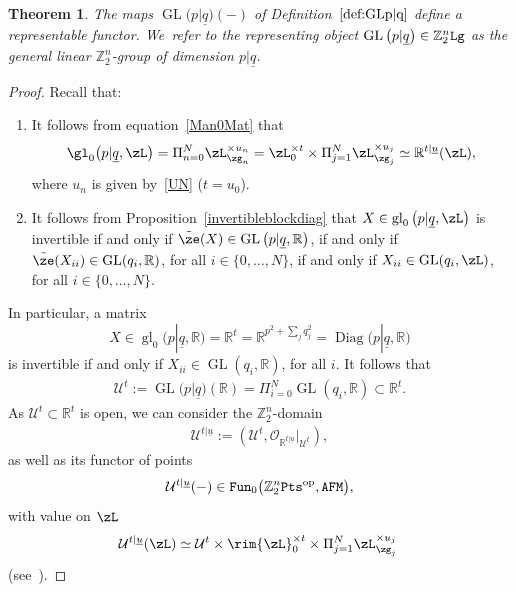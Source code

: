 \documentclass[10pt,a4paper]{amsart}
\newcommand{\op}[1]{\operatorname{#1}}
\newcommand{\R}{{\mathbb R}}
\newcommand{\Z}{{\mathbb Z}}
\def\ul{\underline}
\def\cO{\mathcal{O}}
\def\cU{\mathcal{U}}
\def\ul{\underline}
\newcommand{\0}{\otimes}
\newcommand{\z}{\Z_2^n}
\numberwithin{equation}{section}
\newtheorem{Theorem}{Theorem}[section]
\begin{document}
\begin{Theorem}\label{thm:GLRep}
The maps $\op{GL}\big(p|\ul q\big)(-)$ of Definition~$\ref{def:GLp|q}$ define a representable functor. We~refer to the representing object $\op{GL}\big(p|\ul q\big)\in\z{\tt Lg}$ as the \emph{general linear $\z$-group of dimension} $p|\ul q$. \end{Theorem}



\begin{proof}

Recall that:
\begin{enumerate}\itemsep=0pt
\item
It follows from equation~\eqref{Man0Mat} that
\[
\gl_0\big(p|\ul{q},\zL\big)=\Pi_{n=0}^N\zL_{\zg_n}^{\times u_n}=\zL_0^{\times t}\times \Pi_{j=1}^N \zL_{\zg_j}^{\times u_j}\simeq\R^{t|\ul u}(\zL),
\]
 where $u_n$ is given by~\eqref{UN} ($t=u_0$).

\item
It follows from Proposition~\ref{invertibleblockdiag} that $X\in\op{gl}_0\big(p|\ul q,\zL\big)$ is invertible if and only if $\tilde{\ze}(X)\in\op{GL}\big(p|\ul q,\R\big)$, if and only if $\tilde{\ze}(X_{ii})\in\op{GL}(q_i,\R)$, for all $i\in\{0,\dots, N\}$, if and only if $X_{ii}\in\op{GL}(q_i,\zL)$, for all $i\in\{0,\dots, N\}$.\end{enumerate}

In particular, a matrix
\[
X\in\op{gl}_0\big(p|\ul q,\R\big)=\R^t=\R^{p^2+\sum_jq_j^2}=\op{Diag}\big(p|\ul q,\R\big)
\]
is invertible if and only if $X_{ii}\in\op{GL}(q_i,\R)$, for all $i$. It follows that \begin{gather}\label{GL1}
\cU^t:=\op{GL}\big(p|\ul q\big)(\R)=\Pi_{i=0}^N\op{GL}(q_i,\R)\subset \R^t.
\end{gather}
As $\cU^t\subset\R^t$ is open, we can consider the $\z$-domain
\begin{gather}\label{GL2}
\cU^{t|\ul u}:=(\cU^t,\cO_{\R^{t|\ul u}}|_{\cU^t}),
\end{gather}
as well as its functor of points
\[
\cU^{t|\ul u}(-)\in{\tt Fun}_0\big(\z{\tt Pts}^{\op{op}},{\tt AFM}\big),
\]
with value on $\zL$
\[
\cU^{t|\ul u}(\zL)\simeq\cU^t\times\rim{\zL}^{\times t}_0\times\Pi_{j=1}^N\zL_{\zg_j}^{\times u_j}\;
\]
(see~\cite{Bruce:2019b}).


\end{proof}
\end{document}
